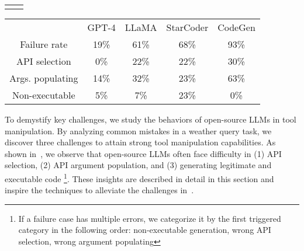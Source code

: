 \begin{table}
\begin{minipage}[t]{0.525\linewidth}
\label{fig:obsv_123}
\vspace{-3pt}
\begin{tabular}{c c}
 &

\end{tabular}
\end{minipage}

\end{table}


\begin{wraptable}[9]{r}{0.55\textwidth}
 \vspace{-1.1em}
\label{tab:error_breakdown}
\small
 \vspace{-0.45em}
\begin{tabular}{@{}cc@{\hskip 0.5em}c@{\hskip 0.5em}c@{\hskip 0.5em}c}
\toprule
\multicolumn{1}{l}{} & GPT-4 & LLaMA & StarCoder & CodeGen \\
\cmidrule(lr){2-5}
Failure rate       & 19\% & 61\%  & 68\%  & 93\%            \\
\midrule
API selection      & 0\%  & 22\%  & 22\%  & 30\%             \\
Args. populating   & 14\% & 32\%  & 23\%  & 63\%             \\
Non-executable     & 5\%  & 7\%   & 23\%  & 0\%	           \\
\bottomrule
\end{tabular}
\end{wraptable}
To demystify key challenges, we study the behaviors of open-source LLMs in tool manipulation. By analyzing common mistakes in a weather query task,
we discover three challenges to attain strong tool manipulation capabilities. As shown in~, we observe that open-source LLMs often 
face difficulty in (1) API selection, (2) API argument population, and (3) generating legitimate and executable code
\footnote{If a failure case has multiple errors, we categorize it by the first triggered category in the following order: non-executable generation, wrong API selection, wrong argument populating}. 
These insights are described in detail in this section and inspire the techniques to alleviate the challenges in~. 

